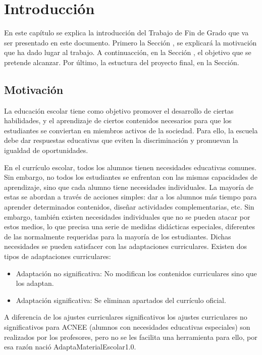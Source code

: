 \chapter{Introducción}
\label{cap:introduccion}

En este capítulo se explica la introducción del Trabajo de Fin de Grado que va ser presentado en este documento. Primero la Sección \cite{Motivación}, se explicará la motivación que ha dado lugar al trabajo. A continuacción, en la Sección \cite{Objetivos}, el objetivo que se pretende alcanzar. Por último, la estuctura del proyecto final, en la Sección.

\section{Motivación}
La educación escolar tiene como objetivo promover el desarrollo de ciertas habilidades, y el aprendizaje de ciertos contenidos necesarios para que los estudiantes se conviertan en miembros activos de la sociedad. Para ello, la escuela debe dar respuestas educativas que eviten la discriminación y promuevan la igualdad de oportunidades.

En el currículo escolar, todos los alumnos tienen necesidades educativas comunes. Sin embargo, no todos los estudiantes se enfrentan con las mismas capacidades de aprendizaje, sino que cada alumno tiene necesidades individuales. La mayoría de estas se abordan a través de acciones simples: dar a los alumnos más tiempo para aprender determinados contenidos, diseñar actividades complementarias, etc.  Sin embargo, también existen necesidades individuales que no se pueden atacar por estos medios, lo que precisa una serie de medidas didácticas especiales, diferentes de las normalmente requeridas para la mayoría de los estudiantes. Dichas necesidades se pueden satisfacer con las adaptaciones curriculares. Existen dos tipos de adaptaciones curriculares:
\begin{itemize}
    \item Adaptación no significativa: No modifican los contenidos curriculares sino que los adaptan.
    \item Adaptación significativa: Se eliminan apartados del currículo oficial.
\end{itemize}
A diferencia de los ajustes curriculares significativos los ajustes curriculares no significativos para ACNEE (alumnos con necesidades educativas especiales) son realizados por los profesores, pero no se les facilita una herramienta para ello, por esa razón nació AdaptaMaterialEscolar1.0.

